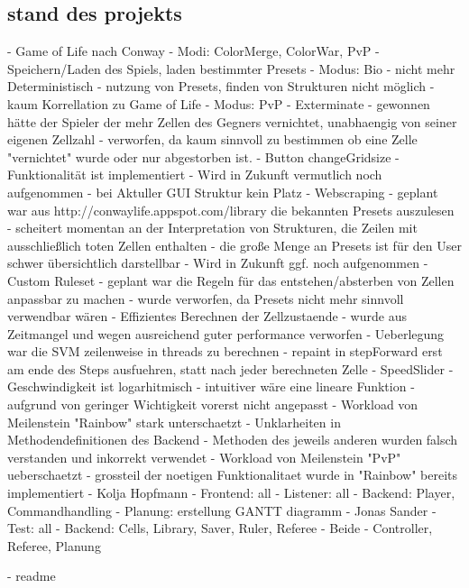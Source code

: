 \documentclass[12pt]{article}
\theoremstyle{plain}
\begin{document}
\begin{linenumbers}
\section{stand des projekts}
- Game of Life nach Conway
- Modi: ColorMerge, ColorWar, PvP
- Speichern/Laden des Spiels, laden bestimmter Presets
- Modus: Bio
	- nicht mehr Deterministisch
	- nutzung von Presets, finden von Strukturen nicht möglich
	- kaum Korrellation zu Game of Life
- Modus: PvP - Exterminate
	- gewonnen hätte der Spieler der mehr Zellen des Gegners vernichtet, unabhaengig von seiner eigenen Zellzahl
	- verworfen, da kaum sinnvoll zu bestimmen ob eine Zelle "vernichtet" wurde oder nur abgestorben ist.
- Button changeGridsize
	- Funktionalität ist implementiert
	- Wird in Zukunft vermutlich noch aufgenommen
	- bei Aktuller GUI Struktur kein Platz
- Webscraping
	- geplant war aus http://conwaylife.appspot.com/library die bekannten Presets auszulesen
	- scheitert momentan an der Interpretation von Strukturen, die Zeilen mit ausschließlich toten Zellen enthalten
	- die große Menge an Presets ist für den User schwer übersichtlich darstellbar
	- Wird in Zukunft ggf. noch aufgenommen
- Custom Ruleset
	- geplant war die Regeln für das entstehen/absterben von Zellen anpassbar zu machen
	- wurde verworfen, da Presets nicht mehr sinnvoll verwendbar wären
- Effizientes Berechnen der Zellzustaende
	- wurde aus Zeitmangel und wegen ausreichend guter performance verworfen
	- Ueberlegung war die SVM zeilenweise in threads zu berechnen
	- repaint in stepForward erst am ende des Steps ausfuehren, statt nach jeder berechneten Zelle
- SpeedSlider
	- Geschwindigkeit ist logarhitmisch
	- intuitiver wäre eine lineare Funktion
	- aufgrund von geringer Wichtigkeit vorerst nicht angepasst
- Workload von Meilenstein "Rainbow" stark unterschaetzt
	- Unklarheiten in Methodendefinitionen des Backend
	- Methoden des jeweils anderen wurden falsch verstanden und inkorrekt verwendet
- Workload von Meilenstein "PvP" ueberschaetzt
	- grossteil der noetigen Funktionalitaet wurde in "Rainbow" bereits implementiert
- Kolja Hopfmann
	- Frontend: all
	- Listener: all
	- Backend: Player, Commandhandling
	- Planung: erstellung GANTT diagramm
- Jonas Sander
	- Test: all
	- Backend: Cells, Library, Saver, Ruler, Referee
- Beide
	- Controller, Referee, Planung

- readme


\end{linenumbers}
\end{document}
